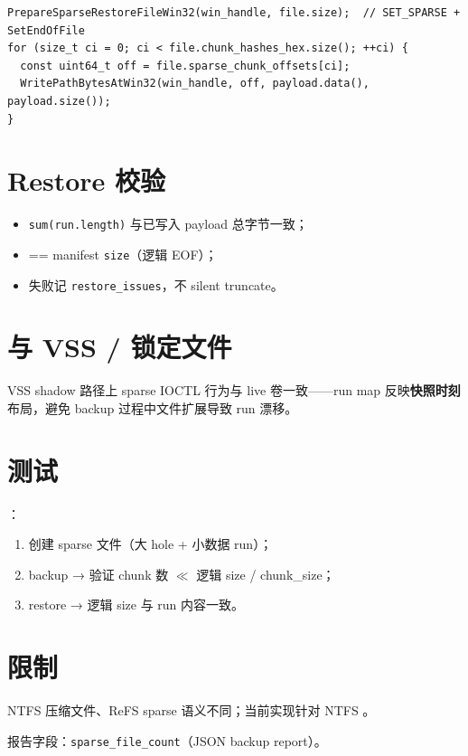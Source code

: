 \begin{lstlisting}[caption={稀疏 restore 写 loop (restore\_engine.cc)}]
PrepareSparseRestoreFileWin32(win_handle, file.size);  // SET_SPARSE + SetEndOfFile
for (size_t ci = 0; ci < file.chunk_hashes_hex.size(); ++ci) {
  const uint64_t off = file.sparse_chunk_offsets[ci];
  WritePathBytesAtWin32(win_handle, off, payload.data(), payload.size());
}
\end{lstlisting}

\section{Restore 校验}

\begin{itemize}[nosep]
  \item \texttt{sum(run.length)} 与已写入 payload 总字节一致；
  \item {} == manifest \texttt{size}（逻辑 EOF）；
  \item 失败记 \texttt{restore\_issues}，不 silent truncate。
\end{itemize}

\section{与 VSS / 锁定文件}

VSS shadow 路径上 sparse IOCTL 行为与 live 卷一致——run map 反映\textbf{快照时刻}布局，避免 backup 过程中文件扩展导致 run 漂移。

\section{测试}

：

\begin{enumerate}[nosep]
  \item 创建 sparse 文件（大 hole + 小数据 run）；
  \item backup → 验证 chunk 数 $\ll$ 逻辑 size / chunk\_size；
  \item restore → 逻辑 size 与 run 内容一致。
\end{enumerate}

\section{限制}

\begin{warnbox}[非 NTFS / 压缩]
NTFS 压缩文件、ReFS sparse 语义不同；当前实现针对 NTFS 。
\end{warnbox}

报告字段：\texttt{sparse\_file\_count}（JSON backup report）。
